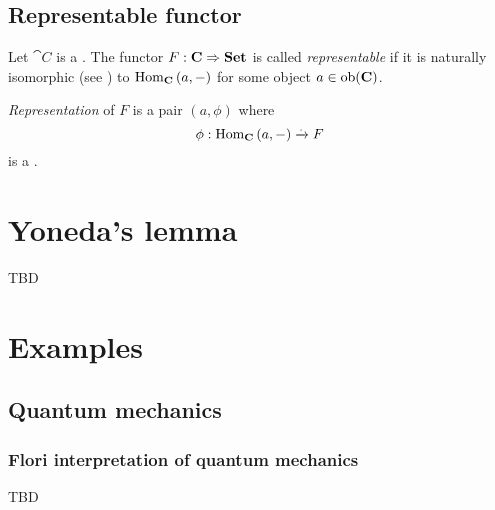 \subsection{Representable functor}
\begin{definition}
\label{def:representable_functor}
Let $\cat{C}$ is a .
The functor $F: \mathbf{C} \Rightarrow \mathbf{Set}$ is called
\textit{representable} if it is naturally isomorphic (see
) to $\mathrm{Hom}_{\mathbf{C}}\left(a, -\right)$ for some object $a \in
\mathrm{ob}(\mathbf{C})$. 

\textit{Representation} of $F$ is a pair $(a, \phi)$ where
\[
\phi: \mathrm{Hom}_{\mathbf{C}}\left(a, -\right) \xrightarrow{.} F
\]
is a .
\end{definition}

\section{Yoneda's lemma}

TBD

\section{Examples}

\subsection{Quantum mechanics}

\subsubsection{Flori interpretation of quantum mechanics}
TBD
